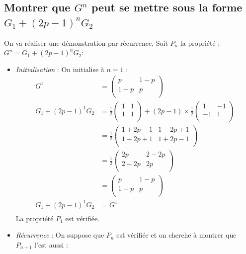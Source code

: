 \documentclass[10pt,a4paper,twoside]{article}
\begin{document}
\subsection{Montrer que $G^{n}$ peut se mettre sous la forme $G_{1}+(2p-1)^{n}G_{2}$}
On va réaliser une démonstration par récurrence, Soit $P_{n}$ la propriété : $G^{n}= G_{1}+(2p-1)^{n}G_{2}$:
\begin{itemize}
\item \textit{Initialisation} : On initialise à $n=1$ :
\begin{align*}
G^{1} &= \left(\begin{array}{cc}
p & 1-p \\
1-p & p \\
\end{array}\right)\\
G_{1}+(2p-1)^{1}G_{2} &= \frac{1}{2}\left(\begin{array}{cc}
 1 & 1\\
 1 & 1 \\
\end{array}\right) + (2p-1) \times \frac{1}{2}\left(\begin{array}{cc}
 1 & -1\\
 -1 & 1 \\
\end{array}\right)\\
&= \frac{1}{2}\left(\begin{array}{cc}
 1+2p-1 & 1-2p+1\\
 1-2p+1 & 1+2p-1 \\
\end{array}\right)\\
&= \frac{1}{2}\left(\begin{array}{cc}
 2p & 2-2p\\
 2-2p & 2p \\
\end{array}\right)\\
&= \left(\begin{array}{cc}
 p & 1-p\\
 1-p & p \\
\end{array}\right)\\
G_{1}+(2p-1)^{1}G_{2} &= G^{1}\\
\end{align*}
La propriété $P_{1}$ est vérifiée.
\item \textit{Récurrence} : On suppose que $P_{n}$ est vérifiée et on cherche à montrer que $P_{n+1}$ l'est aussi :
\begin{align*}

\end{align*}
\end{itemize}
\end{document}
